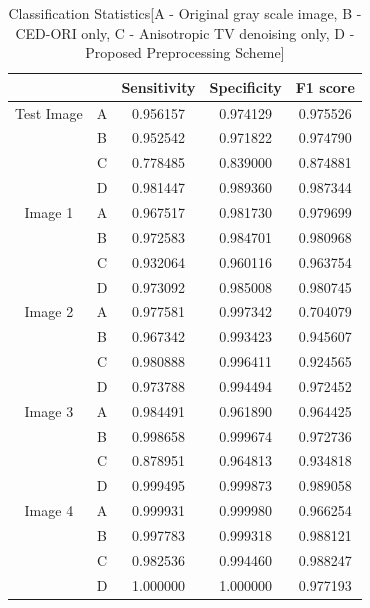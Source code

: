\documentclass[a4paper,11pt]{ijamas}
\begin{document}
\begin{table}
\renewcommand{\arraystretch}{1.3}
\caption{Classification Statistics[A - Original gray scale image, B - CED-ORI only, C - Anisotropic TV denoising only, D - Proposed Preprocessing Scheme]}
\label{tab:class_stats}
\centering
\begin{tabular}{ccccc}
   \hline
          &   & Sensitivity & Specificity & F1 score\\ \hline
Test Image  	& A & 0.956157 & 0.974129 & 0.975526 \\
 			& B & 0.952542 & 0.971822 & 0.974790 \\
          	& C & 0.778485 & 0.839000 & 0.874881 \\
          	& D & 0.981447 & 0.989360 & 0.987344 \\ \hline

Image 1     	& A & 0.967517 & 0.981730 & 0.979699 \\
	  		& B & 0.972583 & 0.984701 & 0.980968 \\
          	& C & 0.932064 & 0.960116 & 0.963754 \\
          	& D & 0.973092 & 0.985008 & 0.980745 \\ \hline

Image 2     	& A & 0.977581 & 0.997342 & 0.704079 \\
	  		& B & 0.967342 & 0.993423 & 0.945607 \\
          	& C & 0.980888 & 0.996411 & 0.924565 \\
          	& D & 0.973788 & 0.994494 & 0.972452 \\ \hline

Image 3     	& A & 0.984491 & 0.961890 & 0.964425 \\
	  		& B & 0.998658 & 0.999674 & 0.972736 \\
          	& C & 0.878951 & 0.964813 & 0.934818 \\
          	& D & 0.999495 & 0.999873 & 0.989058 \\ \hline

Image 4     	& A & 0.999931 & 0.999980 & 0.966254 \\
	  		& B & 0.997783 & 0.999318 & 0.988121 \\
          	& C & 0.982536 & 0.994460 & 0.988247 \\
          	& D & 1.000000 & 1.000000 & 0.977193 \\ \hline
\end{tabular}
\end{table}
\end{document}
